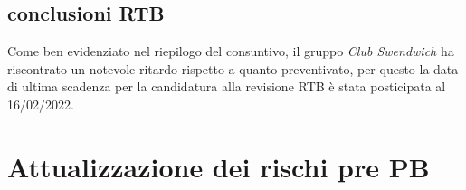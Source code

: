 \subsection{conclusioni RTB}
Come ben evidenziato nel riepilogo del consuntivo, il gruppo \textit{Club Swendwich} ha riscontrato un notevole ritardo rispetto a quanto preventivato, per questo la data di ultima scadenza 
per la candidatura alla revisione RTB è stata posticipata al 16/02/2022.


\section{Attualizzazione dei rischi pre PB}
\label{sec:AttualizzazioneRischiPB}

